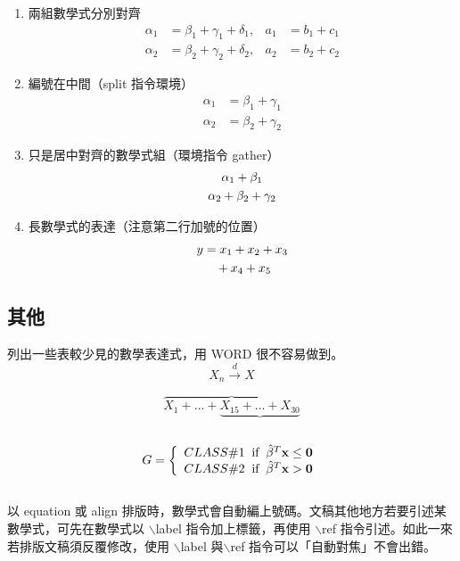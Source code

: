 \begin{enumerate}
    \item 兩組數學式分別對齊
    \begin{align}
        \alpha_1 &= \beta_1+\gamma_1+\delta_1, &a_1 &= b_1+c_1\\
        \alpha_2 &= \beta_2+\gamma_2+\delta_2, &a_2 &= b_2+c_2
    \end{align}

    \item 編號在中間（{\A split} 指令環境）
        \begin{equation}
            \begin{split}
                \alpha_1 &= \beta_1+\gamma_1\\
                \alpha_2 &= \beta_2+\gamma_2
            \end{split}
        \end{equation}
    \item 只是居中對齊的數學式組（環境指令 {\A gather}）
        \begin{gather}
        \alpha_1 + \beta_1\notag\\
        \alpha_2 + \beta_2 + \gamma_2\notag
        \end{gather}

    \item 長數學式的表達（注意第二行加號的位置）
        \begin{align}
            y  	&= x_1 + x_2 + x_3 \notag\\
                	&\quad + x_4 + x_5
        \end{align}
\end{enumerate}

\subsection{其他}
列出一些表較少見的數學表達式，用 WORD 很不容易做到。
  $$X_{n} \stackrel{d}{\longrightarrow} X$$
  
  $$\overbrace{X_{1} + \ldots + \underbrace{X_{15} + \ldots + X_{30}}}$$\\
  \begin{equation*}
    G = \left\{\begin{array}{l}
          CLASS\#1 \;\;\mbox{if} \;\; \hat{\beta}^T\bf{x} \leq 0 \\
          CLASS\#2 \;\;\mbox{if} \;\; \hat{\beta}^T\bf{x} > 0
        \end{array}\right.
  \end{equation*}\\

以 {\A equation} 或 {\A align} 排版時，數學式會自動編上號碼。文稿其他地方若要引述某數學式，可先在數學式以 $\backslash${\A label} 指令加上標籤，再使用 $\backslash${\A ref} 指令引述。如此一來若排版文稿須反覆修改，使用 $\backslash${\A label} 與$\backslash${\A ref} 指令可以「自動對焦」不會出錯。

%
